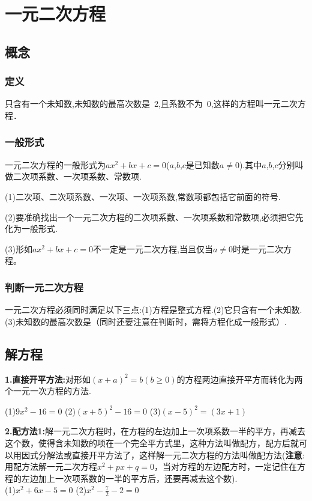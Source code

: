 \chapter{一元二次方程}
\section{概念}
\subsection{定义}
只含有一个未知数,未知数的最高次数是~2,且系数不为~0,这样的方程叫一元二次方程．
\subsection{一般形式}
一元二次方程的一般形式为$ax^2+bx+c=0$($a$,$b$,$c$是已知数$a\neq 0 $).其中$a$,$b$,$c$分别叫做二次项系数、一次项系数、常数项.\par
(1)二次项、二次项系数、一次项、一次项系数,常数项都包括它前面的符号.\par
(2)要准确找出一个一元二次方程的二次项系数、一次项系数和常数项,必须把它先化为一般形式.\par
(3)形如$ax^2+bx+c=0$不一定是一元二次方程,当且仅当$a\neq 0$时是一元二次方程。\par
\subsection{判断一元二次方程}
一元二次方程必须同时满足以下三点:(1)方程是整式方程.(2)它只含有一个未知数.(3)未知数的最高次数是（同时还要注意在判断时，需将方程化成一般形式）.
\section{解方程}
\textbf{1.直接开平方法:}对形如$(x+a)^2=b(b\geq 0)$的方程两边直接开平方而转化为两个一元一次方程的方法. \par 
(1)$9x^2-16=0$ \hspace{1cm}(2)$(x+5)^2-16=0$ \hspace{1cm}(3)$(x-5)^2=(3x+1)$  \\
\vspace{2cm}

\textbf{2.配方法1:}解一元二次方程时，在方程的左边加上一次项系数一半的平方，再减去这个数，使得含未知数的项在一个完全平方式里，这种方法叫做配方，配方后就可以用因式分解法或直接开平方法了，这样解一元二次方程的方法叫做配方法(\textbf{注意}:用配方法解一元二次方程$x^2+px+q=0$，当对方程的左边配方时，一定记住在方程的左边加上一次项系数的一半的平方后，还要再减去这个数).\\
(1)$x^2+6x-5=0$\hspace{1cm} (2)$x^2-\frac{7}{2}-2=0$\\
\vspace{2cm}

